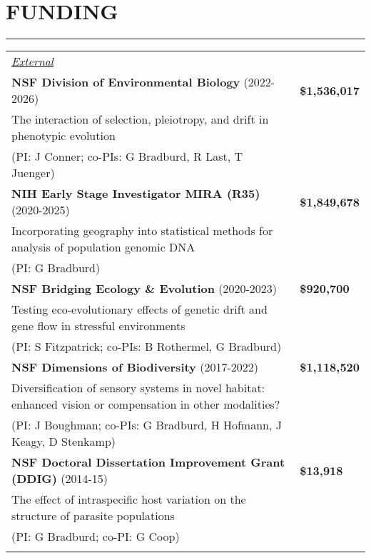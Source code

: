 \documentclass{article}
\begin{document}
\section*{FUNDING}
\vspace{-0.6cm}
\rule{470pt}{0.4pt}
\begin{longtable}{>{\everypar{\dohang}\dohang\raggedright\arraybackslash}p{}p{}}
%
\vspace{-0.6cm}
%
\textit{\underline{External}}\\
\textbf{NSF Division of Environmental Biology} (2022-2026) & \hfill \textbf{\$1,536,017} \\
\hspace{4.5mm} The interaction of selection, pleiotropy, and drift in phenotypic evolution\\
\hspace{4.5mm}(PI: J Conner; co-PIs: G Bradburd, R Last, T Juenger)\\ \vspace{-0.1cm}
%
\textbf{NIH Early Stage Investigator MIRA (R35)} (2020-2025) & \hfill \textbf{\$1,849,678} \\
\hspace{4.5mm} Incorporating geography into statistical methods for analysis of population genomic DNA\\
\hspace{4.5mm}(PI: G Bradburd)\\ \vspace{-0.1cm}
%
\textbf{NSF Bridging Ecology \& Evolution} (2020-2023) & \hfill \textbf{\$920,700} \\
\hspace{4.5mm} Testing eco-evolutionary effects of genetic drift and gene flow in stressful environments\\
\hspace{4.5mm}(PI: S Fitzpatrick; co-PIs: B Rothermel, G Bradburd)\\ \vspace{-0.1cm}
%
\textbf{NSF Dimensions of Biodiversity} (2017-2022) & \hfill \textbf{\$1,118,520} \\
\hspace{4.5mm}Diversification of sensory systems in novel habitat: enhanced vision or compensation in other modalities?\\
\hspace{4.5mm}(PI: J Boughman; co-PIs: G Bradburd, H Hofmann, J Keagy, D Stenkamp)\\ \vspace{-0.1cm}
%
\textbf{NSF Doctoral Dissertation Improvement Grant (DDIG)} (2014-15) & \hfill \textbf{\$13,918}\\
\hspace{4.5mm}The effect of intraspecific host variation on the structure of parasite populations\\
\hspace{4.5mm}(PI: G Bradburd; co-PI: G Coop)\\ \vspace{-0.1cm}\\


\end{longtable}
\end{document}
